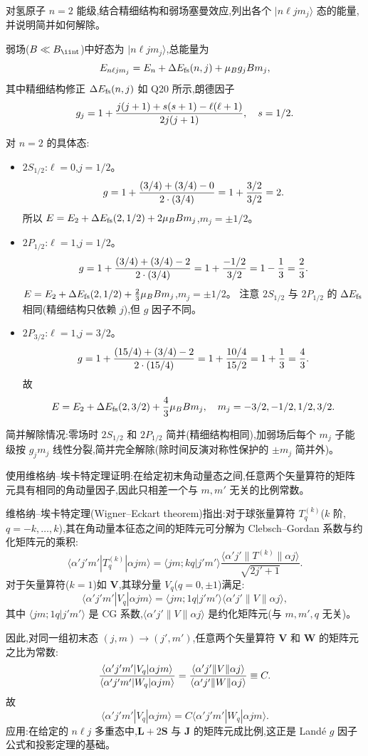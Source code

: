\begin{question}
对氢原子 $n=2$ 能级,结合精细结构和弱场塞曼效应,列出各个 $|n\ell jm_j\rangle$ 态的能量,并说明简并如何解除。
\begin{solution}
弱场($B\ll B_{\rm \ii nt}$)中好态为 $|n\ell j m_j\rangle$,总能量为
\[
E_{n\ell j m_j}=E_n+\Delta E_{\rm fs}(n,j)+\mu_B g_j B m_j,
\]
其中精细结构修正 $\Delta E_{\rm fs}(n,j)$ 如 Q20 所示,朗德因子
\[
g_j=1+{j(j+1)+s(s+1)-\ell(\ell+1)\over2j(j+1)},\quad s=1/2.
\]

对 $n=2$ 的具体态:
\begin{itemize}
\item $2S_{1/2}$:$\ell=0$,$j=1/2$。
  \[
  g=1+{(3/4)+(3/4)-0\over2\cdot(3/4)}=1+{3/2\over3/2}=2.
  \]
  所以 $E=E_2+\Delta E_{\rm fs}(2,1/2)+2\mu_B B m_j$,$m_j=\pm1/2$。
\item $2P_{1/2}$:$\ell=1$,$j=1/2$。
  \[
  g=1+{(3/4)+(3/4)-2\over2\cdot(3/4)}=1+{-1/2\over3/2}=1-{1\over3}={2\over3}.
  \]
  $E=E_2+\Delta E_{\rm fs}(2,1/2)+{2\over3}\mu_B B m_j$,$m_j=\pm1/2$。
  注意 $2S_{1/2}$ 与 $2P_{1/2}$ 的 $\Delta E_{\rm fs}$ 相同(精细结构只依赖 $j$),但 $g$ 因子不同。
\item $2P_{3/2}$:$\ell=1$,$j=3/2$。
  \[
  g=1+{(15/4)+(3/4)-2\over2\cdot(15/4)}=1+{10/4\over15/2}=1+{1\over3}={4\over3}.
  \]
  故
  \[
  E=E_2+\Delta E_{\rm fs}(2,3/2)+{4\over3}\mu_B B m_j,\quad m_j=-3/2,-1/2,1/2,3/2.
  \]
\end{itemize}
简并解除情况:零场时 $2S_{1/2}$ 和 $2P_{1/2}$ 简并(精细结构相同),加弱场后每个 $m_j$ 子能级按 $g_j m_j$ 线性分裂,简并完全解除(除时间反演对称性保护的 $\pm m_j$ 简并外)。
\end{solution}
\end{question}

\begin{question}
使用维格纳--埃卡特定理证明:在给定初末角动量态之间,任意两个矢量算符的矩阵元具有相同的角动量因子,因此只相差一个与 $m,m'$ 无关的比例常数。
\begin{solution}
维格纳--埃卡特定理(Wigner--Eckart theorem)指出:对于球张量算符 $T_q^{(k)}$($k$ 阶,$q=-k,\dots,k$),其在角动量本征态之间的矩阵元可分解为 Clebsch--Gordan 系数与约化矩阵元的乘积:
\[
\langle \alpha'j'm'|T_q^{(k)}|\alpha jm\rangle
=\langle jm;kq|j'm'\rangle
\frac{\langle \alpha'j'\|T^{(k)}\|\alpha j\rangle}{\sqrt{2j'+1}}.
\]
对于矢量算符($k=1$)如 $\mathbf V$,其球分量 $V_q$($q=0,\pm1$)满足:
\[
\langle \alpha'j'm'|V_q|\alpha jm\rangle
=\langle jm;1q|j'm'\rangle
\langle \alpha'j'\|V\|\alpha j\rangle,
\]
其中 $\langle jm;1q|j'm'\rangle$ 是 CG 系数,$\langle \alpha'j'\|V\|\alpha j\rangle$ 是约化矩阵元(与 $m,m',q$ 无关)。

因此,对同一组初末态 $(j,m)\to(j',m')$,任意两个矢量算符 $\mathbf V$ 和 $\mathbf W$ 的矩阵元之比为常数:
\[
{\langle \alpha'j'm'|V_q|\alpha jm\rangle\over
\langle \alpha'j'm'|W_q|\alpha jm\rangle}
={\langle \alpha'j'\|V\|\alpha j\rangle\over
\langle \alpha'j'\|W\|\alpha j\rangle}
\equiv C.
\]
故
\[
\boxed{\langle \alpha'j'm'|V_q|\alpha jm\rangle
=C\langle \alpha'j'm'|W_q|\alpha jm\rangle.}
\]
应用:在给定的 $n\ell j$ 多重态中,$\mathbf L+2\mathbf S$ 与 $\mathbf J$ 的矩阵元成比例,这正是 Land\'e $g$ 因子公式和投影定理的基础。
\end{solution}
\end{question}

